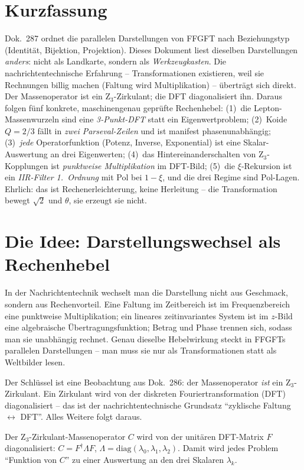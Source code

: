 \section*{Kurzfassung}
Dok.~287 ordnet die parallelen Darstellungen von FFGFT nach Beziehungstyp (Identität, Bijektion,
Projektion). Dieses Dokument liest dieselben Darstellungen \emph{anders}: nicht als Landkarte,
sondern als \emph{Werkzeugkasten}. Die nachrichtentechnische Erfahrung -- Transformationen
existieren, weil sie Rechnungen billig machen (Faltung wird Multiplikation) -- überträgt sich direkt.
Der Massenoperator ist ein Z$_3$-Zirkulant; die DFT diagonalisiert ihn. Daraus folgen fünf konkrete,
maschinengenau geprüfte Rechenhebel: (1)~die Lepton-Massenwurzeln sind eine \emph{3-Punkt-DFT} statt
ein Eigenwertproblem; (2)~Koide $Q=2/3$ fällt in \emph{zwei Parseval-Zeilen} und ist manifest
phasenunabhängig; (3)~\emph{jede} Operatorfunktion (Potenz, Inverse, Exponential) ist eine
Skalar-Auswertung an drei Eigenwerten; (4)~das Hintereinanderschalten von Z$_3$-Kopplungen ist
\emph{punktweise Multiplikation} im DFT-Bild; (5)~die $\xi$-Rekursion ist ein \emph{IIR-Filter
1.~Ordnung} mit Pol bei $1-\xi$, und die drei Regime sind Pol-Lagen. Ehrlich: das ist
Rechenerleichterung, keine Herleitung -- die Transformation bewegt $\sqrt2$ und $\theta$, sie
erzeugt sie nicht.

\section{Die Idee: Darstellungswechsel als Rechenhebel}
In der Nachrichtentechnik wechselt man die Darstellung nicht aus Geschmack, sondern aus Rechenvorteil.
Eine Faltung im Zeitbereich ist im Frequenzbereich eine punktweise Multiplikation; ein lineares
zeitinvariantes System ist im $z$-Bild eine algebraische Übertragungsfunktion; Betrag und Phase
trennen sich, sodass man sie unabhängig rechnet. Genau dieselbe Hebelwirkung steckt in FFGFTs
parallelen Darstellungen -- man muss sie nur als Transformationen statt als Weltbilder lesen.

Der Schlüssel ist eine Beobachtung aus Dok.~286: der Massenoperator \emph{ist} ein Z$_3$-Zirkulant.
Ein Zirkulant wird von der diskreten Fouriertransformation (DFT) diagonalisiert -- das ist der
nachrichtentechnische Grundsatz \enquote{zyklische Faltung $\leftrightarrow$ DFT}. Alles Weitere
folgt daraus.

\begin{keyresult}
Der Z$_3$-Zirkulant-Massenoperator $C$ wird von der unitären DFT-Matrix $F$ diagonalisiert:
$C = F^{\dagger}\Lambda F$, $\Lambda=\mathrm{diag}(\lambda_0,\lambda_1,\lambda_2)$. Damit wird jedes
Problem \enquote{Funktion von $C$} zu einer Auswertung an den drei Skalaren $\lambda_k$.
\end{keyresult}

